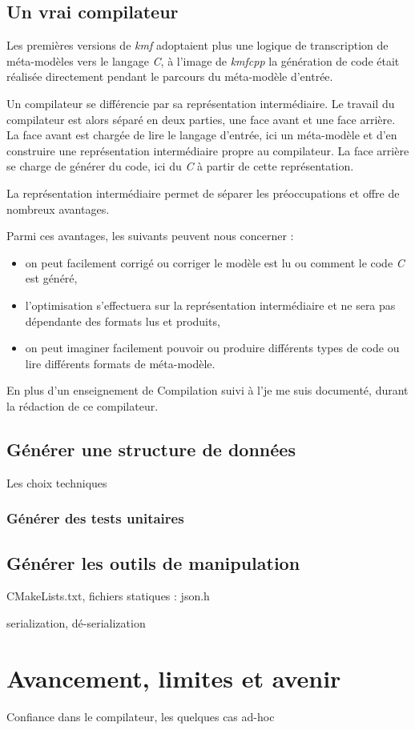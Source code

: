 \subsection{Un vrai compilateur}

Les premières versions de \emph{kmf} adoptaient plus une logique de transcription de méta-modèles vers le langage \emph{C}, à l'image de \emph{kmfcpp} la génération de code était réalisée directement pendant le parcours du méta-modèle d'entrée.

Un compilateur se différencie par sa représentation intermédiaire. Le travail du compilateur est alors séparé en deux parties, une face avant et une face arrière. La face avant est chargée de lire le langage d'entrée, ici un méta-modèle et d'en construire une représentation intermédiaire propre au compilateur. La face arrière se charge de générer du code, ici du \emph{C} à partir de cette représentation.

La représentation intermédiaire permet de séparer les préoccupations et offre de nombreux avantages.

Parmi ces avantages, les suivants peuvent nous concerner :
\begin{itemize}
\item on peut facilement corrigé ou corriger le modèle est lu ou comment le code \emph{C} est généré,
\item l'optimisation s'effectuera sur la représentation intermédiaire et ne sera pas dépendante des formats lus et produits,
\item on peut imaginer facilement pouvoir ou produire différents types de code ou lire différents formats de méta-modèle.
\end{itemize}

En plus d'un enseignement de Compilation suivi à l'\univname je me suis documenté\cite{freeman2004head}, \cite{Appel2003MCI599718} durant la rédaction de ce compilateur.

\subsection{Générer une structure de données}

Les choix techniques

\subsubsection{Générer des tests unitaires}

\subsection{Générer les outils de manipulation}

CMakeLists.txt, fichiers statiques : json.h

serialization, dé-serialization

\section{Avancement, limites et avenir}

Confiance dans le compilateur, les quelques cas ad-hoc




